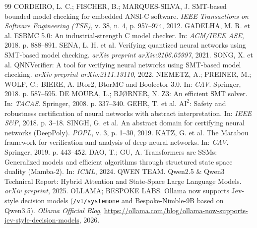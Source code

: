 \documentclass[11pt,a4paper]{article}
\theoremstyle{definition}
\begin{document}
\vspace{0.25cm}
\begin{thebibliography}{99}
 CORDEIRO, L. C.; FISCHER, B.; MARQUES-SILVA, J. SMT-based bounded model checking for embedded ANSI-C software. \textit{IEEE Transactions on Software Engineering (TSE)}, v. 38, n. 4, p. 957--974, 2012.
 GADELHA, M. R. et al. ESBMC 5.0: An industrial-strength C model checker. In: \textit{ACM/IEEE ASE}, 2018. p. 888--891.
 SENA, L. H. et al. Verifying quantized neural networks using SMT-based model checking. \textit{arXiv preprint arXiv:2106.05997}, 2021.
 SONG, X. et al. QNNVerifier: A tool for verifying neural networks using SMT-based model checking. \textit{arXiv preprint arXiv:2111.13110}, 2022.
 NIEMETZ, A.; PREINER, M.; WOLF, C.; BIERE, A. Btor2, BtorMC and Boolector 3.0. In: \textit{CAV}. Springer, 2018. p. 587--595.
 DE MOURA, L.; BJ{\O}RNER, N. Z3: An efficient SMT solver. In: \textit{TACAS}. Springer, 2008. p. 337--340.
 GEHR, T. et al. $\text{AI}^2$: Safety and robustness certification of neural networks with abstract interpretation. In: \textit{IEEE S\&P}, 2018. p. 3--18.
 SINGH, G. et al. An abstract domain for certifying neural networks (DeepPoly). \textit{POPL}, v. 3, p. 1--30, 2019.
 KATZ, G. et al. The Marabou framework for verification and analysis of deep neural networks. In: \textit{CAV}. Springer, 2019. p. 443--452.
 DAO, T.; GU, A. Transformers are SSMs: Generalized models and efficient algorithms through structured state space duality (Mamba-2). In: \textit{ICML}, 2024.
 QWEN TEAM. Qwen2.5 \& Qwen3 Technical Report: Hybrid Attention and State-Space Large Language Models. \textit{arXiv preprint}, 2025.
 OLLAMA; BESPOKE LABS. Ollama now supports Jev-style decision models (\texttt{/v1/systemone} and Bespoke-Nimble-9B based on Qwen3.5). \textit{Ollama Official Blog}, \url{https://ollama.com/blog/ollama-now-supports-jev-style-decision-models}, 2026.
\end{thebibliography}
\end{document}
